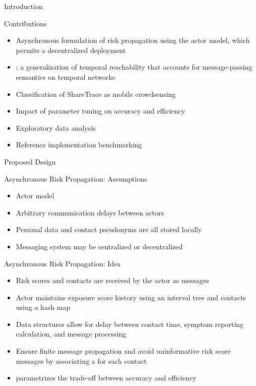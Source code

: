 \documentclass[11pt]{beamer}
\begin{document}
\begin{section}{Introduction}
\begin{frame}{Contributions}
\begin{itemize}
  \item Asynchronous formulation of risk propagation using the actor model, which permits a decentralized deployment
  \pause
  \item {}: a generalization of temporal reachability that accounts for message-passing semantics on temporal networks
  \pause
  \item Classification of ShareTrace as mobile crowdsensing
  \pause
  \item Impact of parameter tuning on accuracy and efficiency
  \pause
  \item Exploratory data analysis
  \pause
  \item Reference implementation benchmarking
\end{itemize}
\end{frame}

\end{section}

\begin{section}{Proposed Design}

\begin{frame}{Asynchronous Risk Propagation: Assumptions}
\begin{itemize}
  \item Actor model \citep{Hewitt1973, Hewitt1977a, Hewitt1977b, Agha1985}
  \pause
  \item Arbitrary communication delays between actors
  \pause
  \item Personal data and contact pseudonyms are all stored locally
  \pause
  \item Messaging system may be centralized or decentralized
\end{itemize}
\end{frame}

\begin{frame}{Asynchronous Risk Propagation: Idea}
\begin{itemize}
  \item Risk scores and contacts are received by the actor as messages
  \pause
  \item Actor maintains exposure score history using an interval tree and contacts using a hash map
  \pause
  \item Data structures allow for delay between contact time, symptom reporting calculation, and message processing
  \pause
  \item Ensure finite message propagation and avoid uninformative risk score messages by associating a  for each contact
  \pause
  \item {} parametrizes the trade-off between accuracy and efficiency
\end{itemize}
\end{frame}

\end{section}
\end{document}
